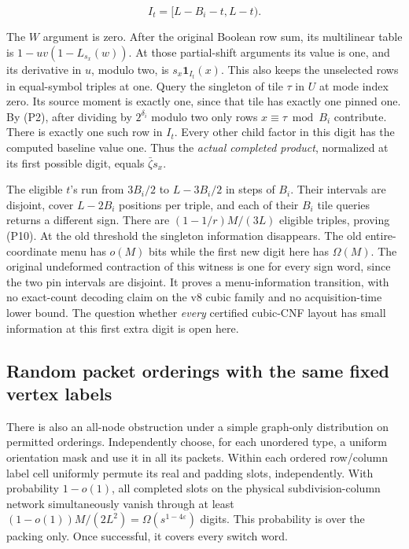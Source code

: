 \documentclass[
  11pt,
]{article}
\begin{document}
\[
       I_t=[L-B_i-t,L-t).
\]

The \(W\) argument is zero. After the original Boolean row sum, its
multilinear table is \(1-uv(1-L_{s_x}(w))\). At those partial-shift
arguments its value is one, and its derivative in \(u\), modulo two, is
\(s_x\mathbf1_{I_t}(x)\). This also keeps the unselected rows in
equal-symbol triples at one. Query the singleton of tile \(\tau\) in
\(U\) at mode index zero. Its source moment is exactly one, since that
tile has exactly one pinned one. By (P2), after dividing by
\(2^{\delta_i}\) modulo two only rows \(x\equiv\tau\bmod B_i\)
contribute. There is exactly one such row in \(I_t\). Every other child
factor in this digit has the computed baseline value one. Thus the
\emph{actual completed product}, normalized at its first possible digit,
equals \(\bar\zeta s_x\).

The eligible \(t\)'s run from \(3B_i/2\) to \(L-3B_i/2\) in steps of
\(B_i\). Their intervals are disjoint, cover \(L-2B_i\) positions per
triple, and each of their \(B_i\) tile queries returns a different sign.
There are \((1-1/r)M/(3L)\) eligible triples, proving (P10). At the old
threshold the singleton information disappears. The old
entire-coordinate menu has \(o(M)\) bits while the first new digit here
has \(\Omega(M)\). The original undeformed contraction of this witness
is one for every sign word, since the two pin intervals are disjoint. It
proves a menu-information transition, with no exact-count decoding claim
on the v8 cubic family and no acquisition-time lower bound. The question
whether \emph{every} certified cubic-CNF layout has small information at
this first extra digit is open here.

\subsection{Random packet orderings with the same fixed vertex
labels}\label{v9-random-packet-orderings-with-the-same-fixed-vertex-labels}

There is also an all-node obstruction under a simple graph-only
distribution on permitted orderings. Independently choose, for each
unordered type, a uniform orientation mask and use it in all its
packets. Within each ordered row/column label cell uniformly permute its
real and padding slots, independently. With probability \(1-o(1)\), all
completed slots on the physical subdivision-column network
simultaneously vanish through at least
\((1-o(1))M/(2L^2)=\Omega(s^{1-4\varepsilon})\) digits. This probability
is over the packing only. Once successful, it covers every switch word.
\end{document}
